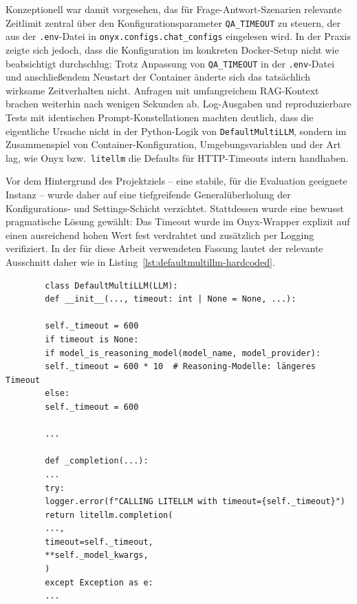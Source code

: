 Konzeptionell war damit vorgesehen, das für Frage-Antwort-Szenarien relevante Zeitlimit zentral über den Konfigurationsparameter \texttt{QA\_TIMEOUT} zu steuern, der aus der \texttt{.env}-Datei in \texttt{onyx.configs.chat\_configs} eingelesen wird.
In der Praxis zeigte sich jedoch, dass die Konfiguration im konkreten Docker-Setup nicht wie beabsichtigt durchschlug:
Trotz Anpassung von \texttt{QA\_TIMEOUT} in der \texttt{.env}-Datei und anschließendem Neustart der Container änderte sich das tatsächlich wirksame Zeitverhalten nicht.
Anfragen mit umfangreichem RAG-Kontext brachen weiterhin nach wenigen Sekunden ab.
Log-Ausgaben und reproduzierbare Tests mit identischen Prompt-Konstellationen machten deutlich, dass die eigentliche Ursache nicht in der Python-Logik von \texttt{DefaultMultiLLM}, sondern im Zusammenspiel von Container-Konfiguration, Umgebungsvariablen und der Art lag, wie Onyx bzw.\ \texttt{litellm} die Defaults für HTTP-Timeouts intern handhaben.

Vor dem Hintergrund des Projektziels – eine stabile, für die Evaluation geeignete Instanz – wurde daher auf eine tiefgreifende Generalüberholung der Konfigurations- und Settings-Schicht verzichtet.
Stattdessen wurde eine bewusst pragmatische Lösung gewählt: Das Timeout wurde im Onyx-Wrapper explizit auf einen ausreichend hohen Wert fest verdrahtet und zusätzlich per Logging verifiziert.
In der für diese Arbeit verwendeten Fassung lautet der relevante Ausschnitt daher wie in Listing~\ref{lst:defaultmultillm-hardcoded}.

\FloatBarrier
\begin{listing}[H]
    \begin{verbatim}
        class DefaultMultiLLM(LLM):
        def __init__(..., timeout: int | None = None, ...):

        self._timeout = 600
        if timeout is None:
        if model_is_reasoning_model(model_name, model_provider):
        self._timeout = 600 * 10  # Reasoning-Modelle: längeres Timeout
        else:
        self._timeout = 600

        ...

        def _completion(...):
        ...
        try:
        logger.error(f"CALLING LITELLM with timeout={self._timeout}")
        return litellm.completion(
        ...,
        timeout=self._timeout,
        **self._model_kwargs,
        )
        except Exception as e:
        ...
    \end{verbatim}
    \caption{Vereinfachter Ausschnitt aus \texttt{DefaultMultiLLM} in Onyx}
    \label{lst:defaultmultillm-hardcoded}
\end{listing}
\FloatBarrier

